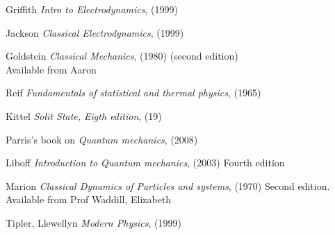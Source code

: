 \documentclass[12pt]{article}  %
\begin{document}
\begin{thebibliography}{99}

Griffith \textit{Intro to Electrodynamics}, (1999)

Jackson \textit{Classical Electrodynamics}, (1999)

Goldstein \textit{Classical Mechanics}, (1980) (second edition)\\ 
Available from Aaron

Reif \textit{Fundamentals of statistical and thermal physics}, (1965)

Kittel \textit{Solit State, Eigth edition}, (19)

Parris's book on \textit{Quantum mechanics}, (2008) \\ 

Liboff \textit{Introduction to Quantum mechanics}, (2003) Fourth edition

Marion \textit{Classical Dynamics of Particles and systems}, (1970) Second edition. \\ 
Available from Prof Waddill, Elizabeth

Tipler, Llewellyn \textit{Modern Physics}, (1999)

\end{thebibliography}
\end{document}

